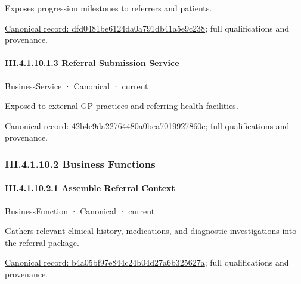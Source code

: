 Exposes progression milestones to referrers and patients.


{\footnotesize \href{../../../../../../../continuum/business/business-service/dfd0481be6124da0a791db41a5e9c238.md}{Canonical record: dfd0481be6124da0a791db41a5e9c238}; full qualifications and provenance.}\par
\paragraph*{III.4.1.10.1.3 Referral Submission Service}
\label{navigation:III.4.1.10.1.3}

\label{element:42b4e9da22764480a0bea7019927860c}
{\small BusinessService · Canonical · current}\par

Exposed to external GP practices and referring health facilities.


{\footnotesize \href{../../../../../../../continuum/business/business-service/42b4e9da22764480a0bea7019927860c.md}{Canonical record: 42b4e9da22764480a0bea7019927860c}; full qualifications and provenance.}\par
\subsubsection*{III.4.1.10.2 Business Functions}
\label{navigation:III.4.1.10.2}

\paragraph*{III.4.1.10.2.1 Assemble Referral Context}
\label{navigation:III.4.1.10.2.1}

\label{element:b4a05bf97e844c24b04d27a6b325627a}
{\small BusinessFunction · Canonical · current}\par

Gathers relevant clinical history, medications, and diagnostic investigations into the referral package.


{\footnotesize \href{../../../../../../../continuum/business/business-function/b4a05bf97e844c24b04d27a6b325627a.md}{Canonical record: b4a05bf97e844c24b04d27a6b325627a}; full qualifications and provenance.}\par
